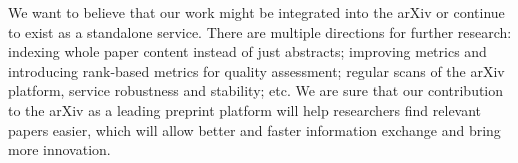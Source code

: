 \documentclass{article}
\begin{document}
        We want to believe that our work might be integrated into the arXiv or continue to exist as a standalone service. There are multiple directions for further research: indexing whole paper content instead of just abstracts; improving metrics and introducing rank-based metrics for quality assessment; regular scans of the arXiv platform, service robustness and stability; etc. We are sure that our contribution to the arXiv as a leading preprint platform will help researchers find relevant papers easier, which will allow better and faster information exchange and bring more innovation. 
    


\end{document}
